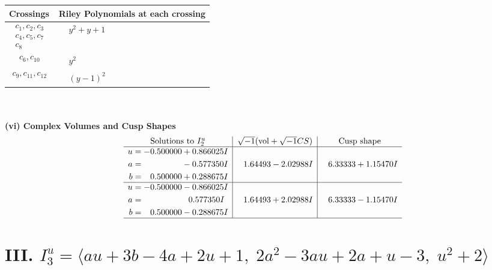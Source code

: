 \documentclass[1p]{elsarticle_modified}
\theoremstyle{definition}
\newcommand{\I}{\sqrt{-1}}
\begin{document}
\begin{tabular}{m{50pt}|m{274pt}}
Crossings & \hspace{64pt}Riley Polynomials at each crossing \\
\hline $$\begin{aligned}c_{1},c_{2},c_{3}\\c_{4},c_{5},c_{7}\\c_{8}\end{aligned}$$&$\begin{aligned}
&y^2+y+1
\end{aligned}$\\
\hline $$\begin{aligned}c_{6},c_{10}\end{aligned}$$&$\begin{aligned}
&y^2
\end{aligned}$\\
\hline $$\begin{aligned}c_{9},c_{11},c_{12}\end{aligned}$$&$\begin{aligned}
&(y-1)^2
\end{aligned}$\\
\hline
\end{tabular}\\~\\
\newpage\flushleft \textbf{(vi) Complex Volumes and Cusp Shapes}
$$\begin{array}{c|c|c}  
\text{Solutions to }I^u_{2}& \I (\text{vol} + \sqrt{-1}CS) & \text{Cusp shape}\\
 \hline 
\begin{aligned}
u &= -0.500000 + 0.866025 I \\
a &= \phantom{-0.000000 } -0.577350 I \\
b &= \phantom{-}0.500000 + 0.288675 I\end{aligned}
 & \phantom{-}1.64493 - 2.02988 I & \phantom{-}6.33333 + 1.15470 I \\ \hline\begin{aligned}
u &= -0.500000 - 0.866025 I \\
a &= \phantom{-0.000000 -}0.577350 I \\
b &= \phantom{-}0.500000 - 0.288675 I\end{aligned}
 & \phantom{-}1.64493 + 2.02988 I & \phantom{-}6.33333 - 1.15470 I\\
 \hline 
 \end{array}$$\newpage\newpage\renewcommand{\arraystretch}{1}
\centering \section*{III. $I^u_{3}= \langle a u+3 b-4 a+2 u+1,\;2 a^2-3 a u+2 a+u-3,\;u^2+2 \rangle$}
\end{document}
